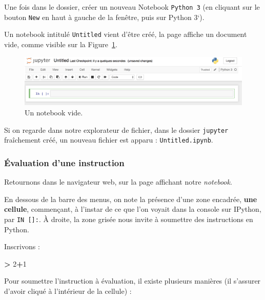 \documentclass[12pt,]{book}
\newenvironment{Shaded}{\begin{snugshade}}{\end{snugshade}}
\newcommand{\DecValTok}[1]{\textcolor[rgb]{0.00,0.00,0.81}{#1}}
\newcommand{\OperatorTok}[1]{\textcolor[rgb]{0.81,0.36,0.00}{\textbf{#1}}}
\numberwithin{equation}{section}
\numberwithin{countremarque}{section}
\begin{document}
Une fois dans le dossier, créer un nouveau Notebook \texttt{Python\ 3}
(en cliquant sur le bouton \texttt{New} en haut à gauche de la fenêtre,
puis sur Python 3`).

Un notebook intitulé \texttt{Untitled} vient d'être créé, la page
affiche un document vide, comme visible sur la
Figure~\ref{fig:intro-jupyter-notebook}.

\begin{figure}[H]

{\centering \includegraphics[width=1\linewidth]{figs/jupyter_notebook} 

}

\caption{Un notebook vide.}\label{fig:intro-jupyter-notebook}
\end{figure}

Si on regarde dans notre explorateur de fichier, dans le dossier
\texttt{jupyter} fraîchement créé, un nouveau fichier est apparu :
\texttt{Untitled.ipynb}.

\subsubsection{Évaluation d'une
instruction}\label{evaluation-dune-instruction}

Retournons dans le navigateur web, sur la page affichant notre
\emph{notebook}.

En dessous de la barre des menus, on note la présence d'une zone
encadrée, \textbf{une cellule}, commençant, à l'instar de ce que l'on
voyait dans la console sur IPython, par \texttt{IN\ {[}{]}:}. À droite,
la zone grisée nous invite à soumettre des instructions en Python.

Inscrivons :

\begin{Shaded}
\begin{Highlighting}[]
\OperatorTok{>} \DecValTok{2}\OperatorTok{+}\DecValTok{1}
\end{Highlighting}
\end{Shaded}

Pour soumettre l'instruction à évaluation, il existe plusieurs manières
(il s'assurer d'avoir cliqué à l'intérieur de la cellule) :
\end{document}
